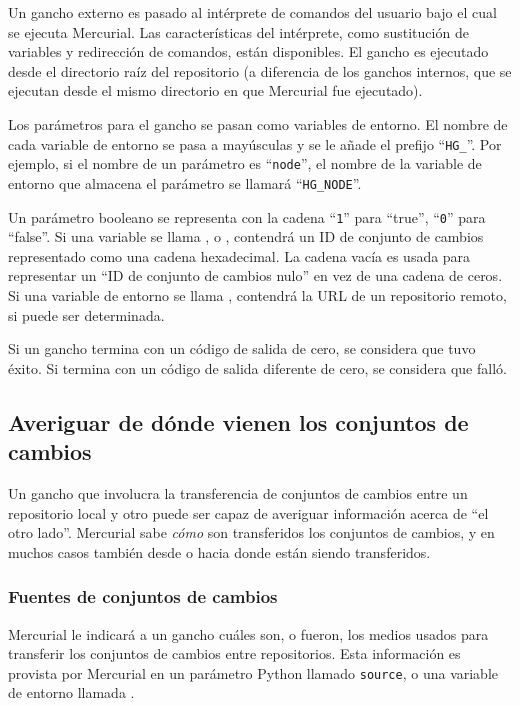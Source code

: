 Un gancho externo es pasado al intérprete de comandos del usuario bajo
el cual se ejecuta Mercurial. Las características del intérprete, como
sustitución de variables y redirección de comandos, están disponibles.
El gancho es ejecutado desde el directorio raíz del repositorio
(a diferencia de los ganchos internos, que se ejecutan desde el mismo
directorio en que Mercurial fue ejecutado).

Los parámetros para el gancho se pasan como variables de entorno. El
nombre de cada variable de entorno se pasa a mayúsculas y se le añade
el prefijo ``\texttt{HG\_}''.  Por ejemplo, si el nombre de un
parámetro es ``\texttt{node}'', el nombre de la variable de entorno
que almacena el parámetro se llamará ``\texttt{HG\_NODE}''.

Un parámetro booleano se representa con la cadena ``\texttt{1}'' para
``true'', ``\texttt{0}'' para ``false''.  Si una variable se llama
,  o ,  
contendrá un ID de conjunto de cambios representado como una cadena
hexadecimal. La cadena vacía es usada para representar un ``ID de
conjunto de cambios nulo'' en vez de una cadena de ceros. Si una
variable de entorno se llama , contendrá la URL de un
repositorio remoto, si puede ser determinada.

Si un gancho termina con un código de salida de cero, se considera que
tuvo éxito. Si termina con un código de salida diferente de cero, se
considera que falló.

\subsection{Averiguar de dónde vienen los conjuntos de cambios}

Un gancho que involucra la transferencia de conjuntos de cambios entre
un repositorio local y otro puede ser capaz de averiguar información
acerca de ``el otro lado''. Mercurial sabe \emph{cómo} son
transferidos los conjuntos de cambios, y en muchos casos también desde
o hacia donde están siendo transferidos.

\subsubsection{Fuentes de conjuntos de cambios}
\label{sec:hook:sources}

Mercurial le indicará a un gancho cuáles son, o fueron, los medios
usados para transferir los conjuntos de cambios entre repositorios.
Esta información es provista por Mercurial en un parámetro Python
llamado \texttt{source}, o una variable de entorno
llamada .


